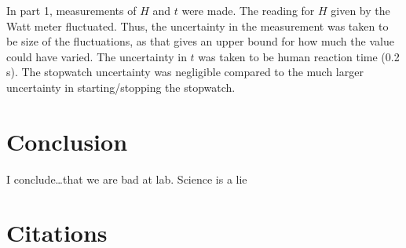 \documentclass[12pt]{iopart} %
\begin{document}
In part 1, measurements of $H$ and $t$ were made.
The reading for $H$ given by the Watt meter fluctuated.
Thus, the uncertainty in the measurement was taken to be size of the fluctuations, as that gives an upper bound for how much the value could have varied.
The uncertainty in $t$ was taken to be human reaction time (0.2 s).
The stopwatch uncertainty was negligible compared to the much larger uncertainty in starting/stopping the stopwatch.

\section{Conclusion}

I conclude\ldots that we are bad at lab.
Science is a lie

\section{Citations}
\end{document}
